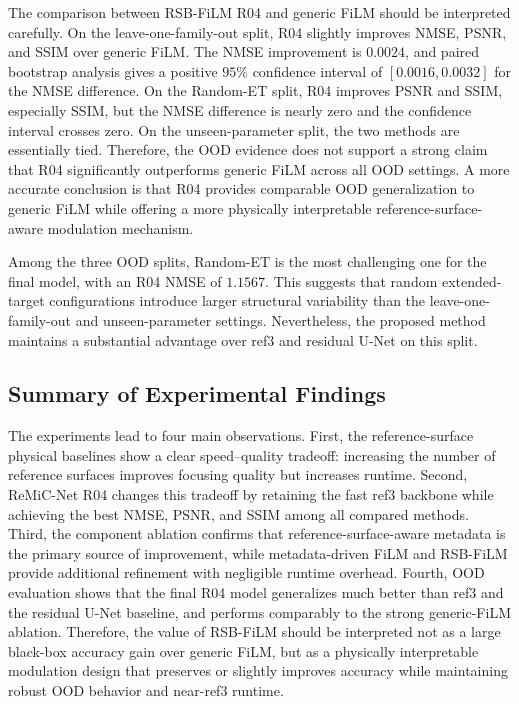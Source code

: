 \documentclass[journal]{IEEEtran}
\begin{document}
The comparison between RSB-FiLM R04 and generic FiLM should be interpreted carefully. On the leave-one-family-out split, R04 slightly improves NMSE, PSNR, and SSIM over generic FiLM. The NMSE improvement is $0.0024$, and paired bootstrap analysis gives a positive $95\%$ confidence interval of $[0.0016,0.0032]$ for the NMSE difference. On the Random-ET split, R04 improves PSNR and SSIM, especially SSIM, but the NMSE difference is nearly zero and the confidence interval crosses zero. On the unseen-parameter split, the two methods are essentially tied. Therefore, the OOD evidence does not support a strong claim that R04 significantly outperforms generic FiLM across all OOD settings. A more accurate conclusion is that R04 provides comparable OOD generalization to generic FiLM while offering a more physically interpretable reference-surface-aware modulation mechanism.

Among the three OOD splits, Random-ET is the most challenging one for the final model, with an R04 NMSE of $1.1567$. This suggests that random extended-target configurations introduce larger structural variability than the leave-one-family-out and unseen-parameter settings. Nevertheless, the proposed method maintains a substantial advantage over ref3 and residual U-Net on this split.

\subsection{Summary of Experimental Findings}
\label{subsec:experimental_summary}

The experiments lead to four main observations. First, the reference-surface physical baselines show a clear speed--quality tradeoff: increasing the number of reference surfaces improves focusing quality but increases runtime. Second, ReMiC-Net R04 changes this tradeoff by retaining the fast ref3 backbone while achieving the best NMSE, PSNR, and SSIM among all compared methods. Third, the component ablation confirms that reference-surface-aware metadata is the primary source of improvement, while metadata-driven FiLM and RSB-FiLM provide additional refinement with negligible runtime overhead. Fourth, OOD evaluation shows that the final R04 model generalizes much better than ref3 and the residual U-Net baseline, and performs comparably to the strong generic-FiLM ablation. Therefore, the value of RSB-FiLM should be interpreted not as a large black-box accuracy gain over generic FiLM, but as a physically interpretable modulation design that preserves or slightly improves accuracy while maintaining robust OOD behavior and near-ref3 runtime.
\end{document}
